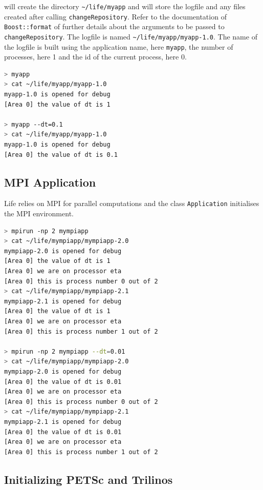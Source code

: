 \documentclass[a4paper]{book}
\begin{document}


will create the directory \lstinline!~/life/myapp! and will store the
logfile and any files created after calling
\lstinline!changeRepository!. Refer to the documentation of
\lstinline!Boost::format! of further details about the arguments to be
passed to \lstinline!changeRepository!. The logfile is named
\lstinline!~/life/myapp/myapp-1.0!. The name of the logfile is built
using the application name, here \lstinline!myapp!, the number of
processes, here 1 and the id of the current process, here 0.

\begin{lstlisting}[language=sh]
> myapp
> cat ~/life/myapp/myapp-1.0
myapp-1.0 is opened for debug
[Area 0] the value of dt is 1

> myapp --dt=0.1
> cat ~/life/myapp/myapp-1.0
myapp-1.0 is opened for debug
[Area 0] the value of dt is 0.1
\end{lstlisting}

\subsection{MPI Application}

Life relies on MPI for parallel computations and the class
\lstinline!Application!  initialises the MPI environment.

\begin{lstlisting}[language=sh]
> mpirun -np 2 mympiapp
> cat ~/life/mympiapp/mympiapp-2.0
mympiapp-2.0 is opened for debug
[Area 0] the value of dt is 1
[Area 0] we are on processor eta
[Area 0] this is process number 0 out of 2
> cat ~/life/mympiapp/mympiapp-2.1
mympiapp-2.1 is opened for debug
[Area 0] the value of dt is 1
[Area 0] we are on processor eta
[Area 0] this is process number 1 out of 2

> mpirun -np 2 mympiapp --dt=0.01
> cat ~/life/mympiapp/mympiapp-2.0
mympiapp-2.0 is opened for debug
[Area 0] the value of dt is 0.01
[Area 0] we are on processor eta
[Area 0] this is process number 0 out of 2
> cat ~/life/mympiapp/mympiapp-2.1
mympiapp-2.1 is opened for debug
[Area 0] the value of dt is 0.01
[Area 0] we are on processor eta
[Area 0] this is process number 1 out of 2
\end{lstlisting}

\subsection{Initializing PETSc and Trilinos}
\end{document}
